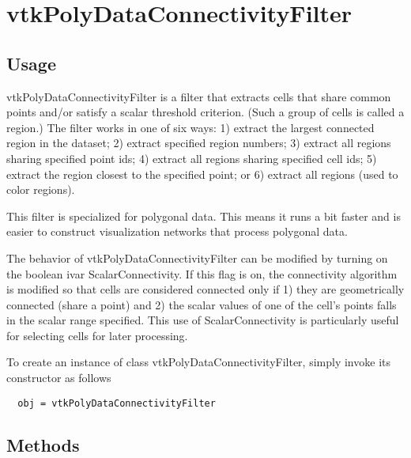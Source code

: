 \section{vtkPolyDataConnectivityFilter}

\subsection{Usage}

 vtkPolyDataConnectivityFilter is a filter that extracts cells that
 share common points and/or satisfy a scalar threshold
 criterion. (Such a group of cells is called a region.) The filter
 works in one of six ways: 1) extract the largest connected region
 in the dataset; 2) extract specified region numbers; 3) extract all
 regions sharing specified point ids; 4) extract all regions sharing
 specified cell ids; 5) extract the region closest to the specified
 point; or 6) extract all regions (used to color regions).

 This filter is specialized for polygonal data. This means it runs a bit 
 faster and is easier to construct visualization networks that process
 polygonal data.

 The behavior of vtkPolyDataConnectivityFilter can be modified by turning
 on the boolean ivar ScalarConnectivity. If this flag is on, the
 connectivity algorithm is modified so that cells are considered connected
 only if 1) they are geometrically connected (share a point) and 2) the
 scalar values of one of the cell's points falls in the scalar range
 specified. This use of ScalarConnectivity is particularly useful for
 selecting cells for later processing.

To create an instance of class vtkPolyDataConnectivityFilter, simply
invoke its constructor as follows
\begin{verbatim}
  obj = vtkPolyDataConnectivityFilter
\end{verbatim}
\subsection{Methods}

